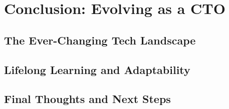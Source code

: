 \chapter{Conclusion: Evolving as a CTO}
\section{The Ever-Changing Tech Landscape}
\section{Lifelong Learning and Adaptability}
\section{Final Thoughts and Next Steps}